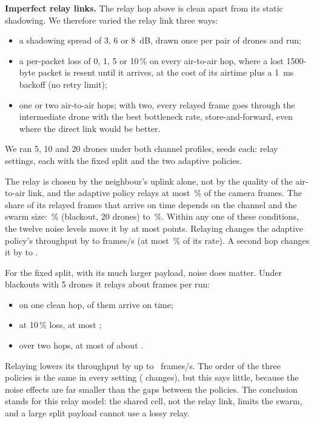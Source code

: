 \textbf{Imperfect relay links.} The relay hop above is clean apart from its static shadowing. We therefore varied the
relay link three ways:
\begin{itemize}
\item a shadowing spread of 3, 6 or 8~dB, drawn once per pair of drones and run;
\item a per-packet loss of 0, 1, 5 or 10\,\% on every air-to-air hop, where a lost 1500-byte packet is resent until it
arrives, at the cost of its airtime plus a 1~ms backoff (no retry limit);
\item one or two air-to-air hops; with two, every relayed frame goes through the intermediate drone with the best
bottleneck rate, store-and-forward, even where the direct link would be better.
\end{itemize}
We ran 5, 10 and 20 drones under both channel profiles, \RnSeeds{} seeds each: \RnSettings{} relay settings, each with
the fixed split and the two adaptive policies.

The relay is chosen by the neighbour's uplink alone, not by the quality of the air-to-air link, and the adaptive
policy relays at most \RnRelayedPct\,\% of the camera frames. The share of its relayed frames that arrive on time
depends on the channel and the swarm size: \RnCondShareMin\,\% (blackout, 20 drones) to \RnCondShareMax\,\%. Within any
one of these conditions, the twelve noise levels move it by at most \RnNoiseSpreadPts{} points. Relaying changes the
adaptive policy's throughput by \RnGainMin{} to \RnGainMax{} frames/s (at most \RnGainRelPct\,\% of its rate). A
second hop changes it by \RnSecondHopMin{} to \RnSecondHopMax.

For the fixed split, with its much larger payload, noise does matter. Under blackouts with 5 drones it relays about
\RnFixedSent{} frames per run:
\begin{itemize}
\item on one clean hop, \RnFixedOnClean{} of them arrive on time;
\item at 10\,\% loss, at most \RnFixedOnLoss;
\item over two hops, at most \RnFixedTwoHopMax{} of about \RnFixedTwoHopSent{}.
\end{itemize}
Relaying lowers its throughput by up to \RnFixedGainMin{}~frames/s. The order of the three policies is the same in every
setting (\RnRankChanges{} changes), but this says little, because the noise effects are far smaller than the gaps
between the policies. The conclusion stands for this relay model: the shared cell, not the relay link, limits the swarm,
and a large split payload cannot use a lossy relay.
